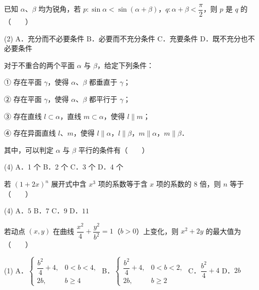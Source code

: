 \begin{question}
已知 $\alpha$、$\beta$ 均为锐角，若 $p : \sin\alpha < \sin(\alpha + \beta)$，$q : \alpha + \beta < \dfrac{\pi}{2}$，则 $p$ 是 $q$ 的\mbox{（　　）}

\begin{gkopts}(2)
\task A．充分而不必要条件
\task B．必要而不充分条件
\task C．充要条件
\task D．既不充分也不必要条件
\end{gkopts}

\end{question}
\begin{question}
对于不重合的两个平面 $\alpha$ 与 $\beta$，给定下列条件：

① 存在平面 $\gamma$，使得 $\alpha$、$\beta$ 都垂直于 $\gamma$；

② 存在平面 $\gamma$，使得 $\alpha$、$\beta$ 都平行于 $\gamma$；

③ 存在直线 $l \subset \alpha$，直线 $m \subset \alpha$，使得 $l \parallel m$；

④ 存在异面直线 $l$、$m$，使得 $l \parallel \alpha$，$l \parallel \beta$，$m \parallel \alpha$，$m \parallel \beta$．

其中，可以判定 $\alpha$ 与 $\beta$ 平行的条件有\mbox{（　　）}

\begin{gkopts}(4)
\task A．1 个
\task B．2 个
\task C．3 个
\task D．4 个
\end{gkopts}

\end{question}
\begin{question}
若 $(1 + 2x)^n$ 展开式中含 $x^3$ 项的系数等于含 $x$ 项的系数的 8 倍，则 $n$ 等于\mbox{（　　）}

\begin{gkopts}(4)
\task A．$5$
\task B．$7$
\task C．$9$
\task D．$11$
\end{gkopts}

\end{question}
\begin{question}
若动点 $(x, y)$ 在曲线 $\dfrac{x^2}{4} + \dfrac{y^2}{b^2} = 1$（$b > 0$）上变化，则 $x^2 + 2y$ 的最大值为\mbox{（　　）}

\begin{gkopts}(1)
\task A．$\begin{cases} \dfrac{b^2}{4} + 4, & 0 < b < 4, \\ 2b, & b \geqslant 4 \end{cases}$
\task B．$\begin{cases} \dfrac{b^2}{4} + 4, & 0 < b < 2, \\ 2b, & b \geqslant 2 \end{cases}$
\task C．$\dfrac{b^2}{4} + 4$
\task D．$2b$
\end{gkopts}

\Needspace{0.4\textheight}
\end{question}
